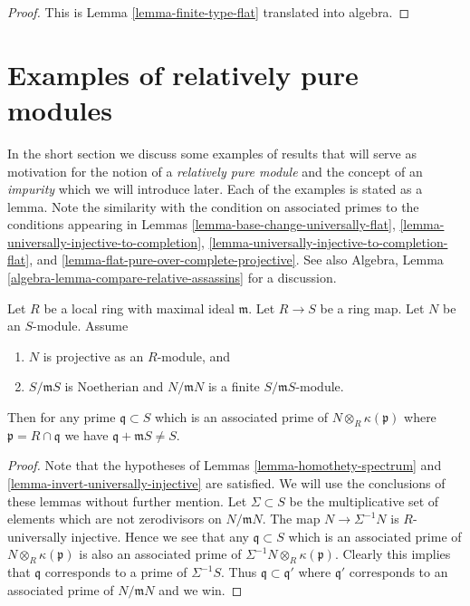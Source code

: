 \begin{proof}
This is Lemma \ref{lemma-finite-type-flat} translated into algebra.
\end{proof}








\section{Examples of relatively pure modules}
\label{section-examples-pure-modules}

\noindent
In the short section we discuss some examples of results that will serve
as motivation for the notion of a {\it relatively pure module} and the
concept of an {\it impurity} which we will introduce later. Each of the
examples is stated as a lemma. Note the similarity with the condition on
associated primes to the conditions appearing in
Lemmas \ref{lemma-base-change-universally-flat},
\ref{lemma-universally-injective-to-completion},
\ref{lemma-universally-injective-to-completion-flat}, and
\ref{lemma-flat-pure-over-complete-projective}.
See also
Algebra, Lemma \ref{algebra-lemma-compare-relative-assassins}
for a discussion.

\begin{lemma}
\label{lemma-explain-why-pure}
Let $R$ be a local ring with maximal ideal $\mathfrak m$.
Let $R \to S$ be a ring map. Let $N$ be an $S$-module.
Assume
\begin{enumerate}
\item $N$ is projective as an $R$-module, and
\item $S/\mathfrak mS$ is Noetherian and $N/\mathfrak mN$ is a finite
$S/\mathfrak mS$-module.
\end{enumerate}
Then for any prime $\mathfrak q \subset S$ which is an associated prime of
$N \otimes_R \kappa(\mathfrak p)$ where $\mathfrak p = R \cap \mathfrak q$
we have $\mathfrak q + \mathfrak m S \not = S$.
\end{lemma}

\begin{proof}
Note that the hypotheses of
Lemmas \ref{lemma-homothety-spectrum} and
\ref{lemma-invert-universally-injective}
are satisfied. We will use the conclusions of these lemmas without further
mention. Let $\Sigma \subset S$ be the multiplicative set of elements
which are not zerodivisors on $N/\mathfrak mN$. The map
$N \to \Sigma^{-1}N$ is $R$-universally injective. Hence we see that
any $\mathfrak q \subset S$ which is an associated prime of
$N \otimes_R \kappa(\mathfrak p)$ is also an associated prime of
$\Sigma^{-1}N \otimes_R \kappa(\mathfrak p)$. Clearly this implies that
$\mathfrak q$ corresponds to a prime of $\Sigma^{-1}S$.
Thus $\mathfrak q \subset \mathfrak q'$ where $\mathfrak q'$
corresponds to an associated prime of $N/\mathfrak mN$ and we win.
\end{proof}

